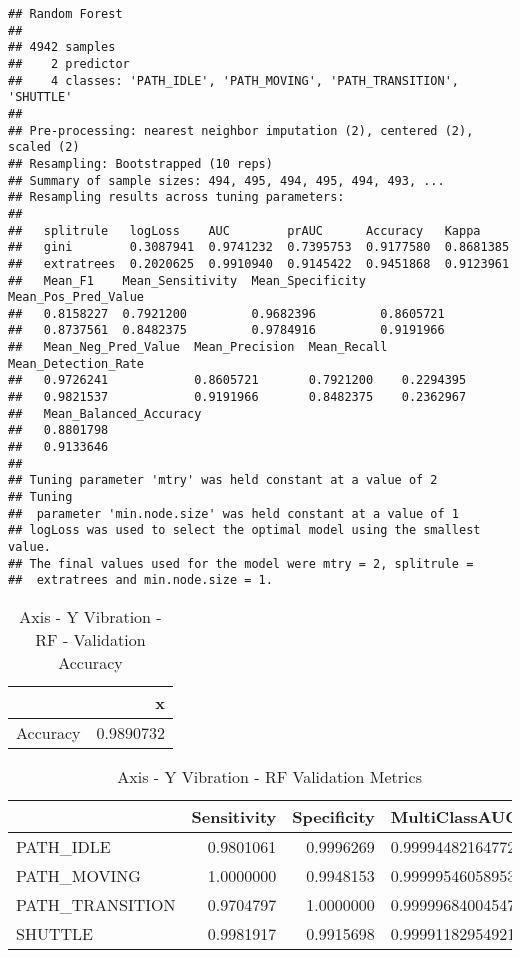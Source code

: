 \documentclass[]{article}
\begin{document}
\begin{verbatim}
## Random Forest 
## 
## 4942 samples
##    2 predictor
##    4 classes: 'PATH_IDLE', 'PATH_MOVING', 'PATH_TRANSITION', 'SHUTTLE' 
## 
## Pre-processing: nearest neighbor imputation (2), centered (2), scaled (2) 
## Resampling: Bootstrapped (10 reps) 
## Summary of sample sizes: 494, 495, 494, 495, 494, 493, ... 
## Resampling results across tuning parameters:
## 
##   splitrule   logLoss    AUC        prAUC      Accuracy   Kappa    
##   gini        0.3087941  0.9741232  0.7395753  0.9177580  0.8681385
##   extratrees  0.2020625  0.9910940  0.9145422  0.9451868  0.9123961
##   Mean_F1    Mean_Sensitivity  Mean_Specificity  Mean_Pos_Pred_Value
##   0.8158227  0.7921200         0.9682396         0.8605721          
##   0.8737561  0.8482375         0.9784916         0.9191966          
##   Mean_Neg_Pred_Value  Mean_Precision  Mean_Recall  Mean_Detection_Rate
##   0.9726241            0.8605721       0.7921200    0.2294395          
##   0.9821537            0.9191966       0.8482375    0.2362967          
##   Mean_Balanced_Accuracy
##   0.8801798             
##   0.9133646             
## 
## Tuning parameter 'mtry' was held constant at a value of 2
## Tuning
##  parameter 'min.node.size' was held constant at a value of 1
## logLoss was used to select the optimal model using the smallest value.
## The final values used for the model were mtry = 2, splitrule =
##  extratrees and min.node.size = 1.
\end{verbatim}

\begin{table}[!h]

\caption{\label{tab:sensor-y-vib-rf-results}Axis - Y Vibration - RF - Validation Accuracy}
\centering
\begin{tabular}[t]{lr}
\toprule
  & x\\
\midrule
Accuracy & 0.9890732\\
\bottomrule
\end{tabular}
\end{table}

\begin{table}[!h]

\caption{\label{tab:sensor-y-vib-rf-results}Axis - Y Vibration - RF Validation Metrics}
\centering
\begin{tabular}[t]{lrrl}
\toprule
  & Sensitivity & Specificity & MultiClassAUC\\
\midrule
PATH\_IDLE & 0.9801061 & 0.9996269 & 0.999944821647729\\
PATH\_MOVING & 1.0000000 & 0.9948153 & 0.999995460589537\\
PATH\_TRANSITION & 0.9704797 & 1.0000000 & 0.999996840045472\\
SHUTTLE & 0.9981917 & 0.9915698 & 0.999911829549214\\
\bottomrule
\end{tabular}
\end{table}
\end{document}
